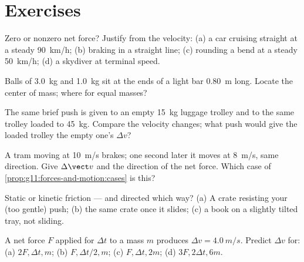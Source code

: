 \section{Exercises}

\begin{exercise}[$\star$]\label{exo:g11:forces-and-motion:1}
Zero or nonzero net force? Justify from the velocity: (a) a car cruising
straight at a steady \qty{90}{km/h}; (b) braking in a straight line;
(c) rounding a bend at a steady \qty{50}{km/h}; (d) a skydiver at
terminal speed.
\end{exercise}

\begin{exercise}[$\star$]\label{exo:g11:forces-and-motion:2}
Balls of \qty{3.0}{kg} and \qty{1.0}{kg} sit at the ends of a light bar
\qty{0.80}{m} long. Locate the center of mass; where for equal masses?
\end{exercise}

\begin{exercise}[$\star$]\label{exo:g11:forces-and-motion:3}
The same brief push is given to an empty \qty{15}{kg} luggage trolley
and to the same trolley loaded to \qty{45}{kg}. Compare the velocity
changes; what push would give the loaded trolley the empty one's $\Delta v$?
\end{exercise}

\begin{exercise}[$\star$]\label{exo:g11:forces-and-motion:4}
A tram moving at \qty{10}{m/s} brakes; one second later it moves at
\qty{8}{m/s}, same direction. Give $\Delta \vect v$ and the direction of
the net force. Which case of \cref{prop:g11:forces-and-motion:cases} is this?
\end{exercise}

\begin{exercise}[$\star$]\label{exo:g11:forces-and-motion:5}
Static or kinetic friction --- and directed which way? (a) A crate
resisting your (too gentle) push; (b) the same crate once it slides;
(c) a book on a slightly tilted tray, not sliding.
\end{exercise}

\begin{exercise}[$\star\star$]\label{exo:g11:forces-and-motion:6}
A net force $F$ applied for $\Delta t$ to a mass $m$ produces
$\Delta v = \qty{4.0}{m/s}$. Predict $\Delta v$ for: (a) $2F, \Delta t, m$;
(b) $F, \Delta t/2, m$; (c) $F, \Delta t, 2m$; (d) $3F, 2\Delta t, 6m$.
\end{exercise}

